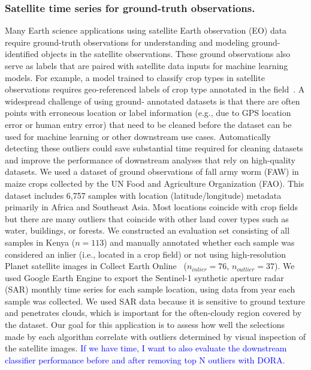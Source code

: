 \documentclass[letterpaper]{article} %
\newcommand{\todo}[1]{\textcolor{blue}{#1}}
\begin{document}
\subsubsection{Satellite time series for ground-truth observations.}
Many Earth science applications using satellite Earth observation (EO) data
 require ground-truth observations for understanding and modeling ground-
 identified objects in the satellite observations. These ground observations
 also serve as labels that are paired with satellite data inputs for machine 
 learning models. For example, a model trained to classify crop types in
 satellite observations requires geo-referenced labels of crop type annotated
 in the field~\cite{tseng2021learning}. A widespread challenge of using ground-
 annotated datasets is that there are often points with erroneous location or 
 label information (e.g., due to GPS location error or human entry error) that
 need to be cleaned before the dataset can be used for machine learning or
 other downstream use cases. Automatically detecting these outliers could save 
 substantial time required for cleaning datasets and improve the performance of
 downstream analyses that rely on high-quality datasets. 
 We used a dataset of ground
 observations of fall army worm (FAW) in maize crops collected by the UN Food
 and Agriculture Organization (FAO). This dataset includes 6,757 samples
 with location (latitude/longitude) metadata primarily in Africa and Southeast
 Asia. Most locations coincide with crop
 fields but there are many outliers that coincide with other land cover types 
 such as water, buildings, or forests. We constructed an evaluation set 
 consisting of all samples in Kenya ($n=113$) and manually annotated whether 
 each sample was considered an inlier (i.e., located in a crop field) or not 
 using high-resolution Planet satellite images in Collect Earth 
 Online~\cite{planetdata} ($n_{inlier}=76$, $n_{outlier}=37$). We used Google
 Earth Engine to export the Sentinel-1 synthetic aperture radar (SAR) monthly
 time series for each sample location, using data from year each sample was 
 collected. We used SAR data because it is sensitive to ground texture and
  penetrates clouds, which is important for the often-cloudy region covered
  by the dataset. Our goal for this application is to assess how well the 
  selections made by each algorithm correlate with outliers determined by
  visual inspection of the satellite images.
 \todo{If we have time, I want to also evaluate the downstream classifier
 performance before and after removing top N outliers with DORA.}
\end{document}

